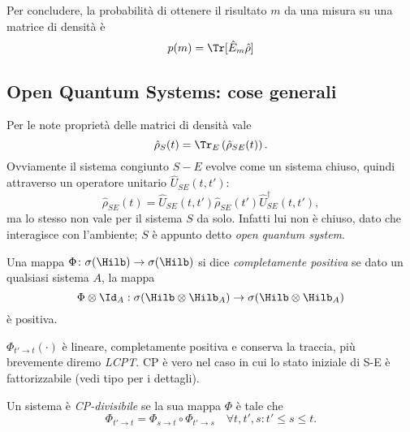 \documentclass[a4]{article}
\begin{document}
Per concludere, la probabilità di ottenere il risultato \(m\) da una misura su
una matrice di densità è
\[p(m) = \Tr[\hat{E}_m \hat{\rho}]\]



\subsection{Open Quantum Systems: cose generali}
Per le note proprietà delle matrici di densità vale 
\[\hat{\rho}_S(t) = \Tr_E\left(\hat{\rho}_{SE}(t)\right).\]
Ovviamente il sistema congiunto \(S-E\) evolve come un sistema chiuso, quindi attraverso un
operatore unitario \(\hat{U}_{SE}(t, t')\):
\[\hat{\rho}_{SE}(t) = \hat{U}_{SE}(t, t') \hat{\rho}_{SE}(t') \hat{U}^{\dag}_{SE}(t, t'),\]
ma lo stesso non vale per il sistema \(S\) da solo. Infatti lui non è chiuso, dato che interagisce
con l'ambiente; \(S\) è appunto detto \emph{open quantum system}.

\begin{defn} Una mappa \(\Phi\colon \sigma(\Hilb) \to \sigma(\Hilb) \)
si dice \emph{completamente positiva} se dato un qualsiasi sistema \(A\), la mappa
\[\Phi \otimes \Id_A: \sigma(\Hilb \otimes \Hilb_A) \to \sigma(\Hilb \otimes \Hilb_A) \]
è positiva.
\end{defn}

\(\Phi_{t'\to t}(\cdot)\) è lineare, completamente positiva e conserva la traccia,
più brevemente  diremo \emph{LCPT}. CP è vero nel caso in cui lo stato iniziale di
S-E è fattorizzabile (vedi tipo \cite{breuer2007theory} per i dettagli).

\begin{defn} Un sistema è \emph{CP-divisibile} se la sua
mappa \(\Phi\) è tale che
\begin{equation} \label{eq:CPdiv}
\Phi_{t'\to t} = \Phi_{s\to t} \circ \Phi_{t'\to s} \quad \forall t, t', s: t' \le s \le t.
\end{equation}
\end{defn}
\end{document}
